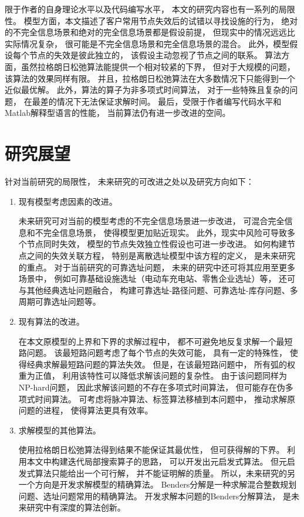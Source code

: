 限于作者的自身理论水平以及代码编写水平，
本文的研究内容也有一系列的局限性。
模型方面，本文描述了客户常用节点失效后的试错以寻找设施的行为，
绝对的不完全信息场景和绝对的完全信息场景都是假设前提，
但现实中的情况远远比实际情况复杂，
很可能是不完全信息场景和完全信息场景的混合。
此外，模型假设每个节点的失效是彼此独立的，
该假设主动忽视了节点之间的联系。
算法方面，虽然拉格朗日松弛算法能提供一个相对较紧的下界，
但对于大规模的问题，
该算法的效果同样有限。
并且，拉格朗日松弛算法在大多数情况下只能得到一个近似最优解。
此外，算法的算子为非多项式时间算法，
对于一些特殊且复杂的问题，
在最差的情况下无法保证求解时间。
最后，受限于作者编写代码水平和Matlab解释型语言的性能，
当前算法仍有进一步改进的空间。


\section{研究展望}
\label{sec:future}

针对当前研究的局限性，
未来研究的可改进之处以及研究方向如下：

\begin{enumerate}[label=(\arabic*),leftmargin=0pt,itemindent=3.5\ccwd,listparindent = 2\ccwd, nosep]
    \item 现有模型考虑因素的改进。
    
    未来研究可对当前的模型考虑的不完全信息场景进一步改进，
    可混合完全信息和不完全信息场景，
    使得模型更加贴近现实。
    此外，现实中风险可导致多个节点同时失效，
    模型的节点失效独立性假设也可进一步改进。
    如何构建节点之间的失效关联方程，
    特别是离散选址模型中该方程的定义，
    是未来研究的重点。
    对于当前研究的可靠选址问题，
    未来的研究中还可将其应用至更多场景中，
    例如可靠基础设施选址（电动车充电站、零售企业选址）等，
    还可与其他经典选址问题融合，
    构建可靠选址-路径问题、可靠选址-库存问题、多周期可靠选址问题等。

    \item 现有算法的改进。
    
    在本文原模型的上界和下界的求解过程中，
    都不可避免地反复求解一个最短路问题。
    该最短路问题考虑了每个节点的失效可能，
    具有一定的特殊性，
    使得经典求解最短路问题的算法失效。
    但是，在该最短路问题中，
    所有弧的权重为正值，
    利用该特性可以降低求解该问题的复杂性。
    由于该问题同样为NP-hard问题，
    因此求解该问题的不存在多项式时间算法，
    但可能存在伪多项式时间算法。
    可考虑将脉冲算法、标签算法移植到本问题中，
    推动求解原问题的进程，
    使得算法更具有效率。

    \item 求解模型的其他算法。
    
    使用拉格朗日松弛算法得到结果不能保证其最优性，
    但可获得解的下界。
    利用本文中构建迭代局部搜索算子的思路，
    可以开发出元启发式算法。
    但元启发式算法只能给出一个可行解，
    并不能证明解的质量。
    所以，未来研究的另一个方向是开发求解模型的精确算法。
    Benders分解是一种求解混合整数规划问题、选址问题常用的精确算法。
    开发求解本问题的Benders分解算法，
    是未来研究中有深度的算法创新。

\end{enumerate}
